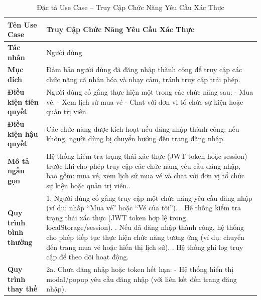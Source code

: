 \renewcommand{\arraystretch}{1.3}
\setlength{\tabcolsep}{8pt}
\begin{longtable}{|p{}|p{}|}
\caption{Đặc tả Use Case -- Truy Cập Chức Năng Yêu Cầu Xác Thực}
\label{tab:uc_auth_access} \\
\hline
\textbf{Tên Use Case} & Truy Cập Chức Năng Yêu Cầu Xác Thực \\ \hline
\textbf{Tác nhân} & Người dùng \\ \hline
\textbf{Mục đích} & Đảm bảo người dùng đã đăng nhập thành công để truy cập các chức năng cá nhân hóa và nhạy cảm, tránh truy cập trái phép. \\ \hline
\textbf{Điều kiện tiên quyết} &
Người dùng cố gắng thực hiện một trong các chức năng sau: \newline
\hspace*{1em}- Mua vé. \newline
\hspace*{1em}- Xem lịch sử mua vé \newline
\hspace*{1em}- Chat với đơn vị tổ chức sự kiện hoặc quản trị viên. \\ \hline
\textbf{Điều kiện hậu quyết} & Các chức năng được kích hoạt nếu đăng nhập thành công; nếu không, người dùng bị chuyển hướng đến trang đăng nhập. \\ \hline
\textbf{Mô tả ngắn gọn} & Hệ thống kiểm tra trạng thái xác thực (JWT token hoặc session) trước khi cho phép truy cập các chức năng yêu cầu đăng nhập, bao gồm: mua vé, xem lịch sử mua vé và chat với đơn vị tổ chức sự kiện hoặc quản trị viên..\\ \hline
\textbf{Quy trình bình thường} &
1. Người dùng cố gắng truy cập một chức năng yêu cầu đăng nhập (ví dụ: nhấp “Mua vé” hoặc “Vé của tôi”). \newline
2. Hệ thống kiểm tra trạng thái xác thực (JWT token hợp lệ trong localStorage/session). \newline
3. Nếu đã đăng nhập thành công, hệ thống cho phép tiếp tục thực hiện chức năng tương ứng (ví dụ: chuyển đến trang mua vé hoặc hiển thị lịch sử). \newline
4. Hệ thống ghi log truy cập để theo dõi hoạt động. \\ \hline
\textbf{Quy trình thay thế} &
2a. Chưa đăng nhập hoặc token hết hạn: \newline
\hspace*{1em}- Hệ thống hiển thị modal/popup yêu cầu đăng nhập (với liên kết đến trang đăng nhập). \newline

\end{longtable}
